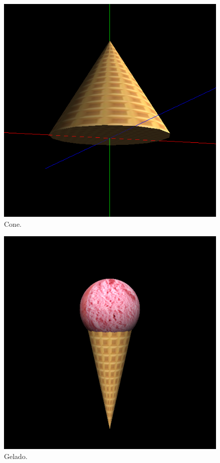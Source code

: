 \documentclass[12pt, a4paper]{article}
\begin{document}
\begin{figure}[H]
    \centering
    \includegraphics[width=\textwidth]{res/phase4/Cone.png}
    \caption{Cone.}
\end{figure}

\begin{figure}[H]
    \centering
    \includegraphics[width=\textwidth]{res/phase4/IceCream.png}
    \caption{Gelado.}
\end{figure}
\end{document}
